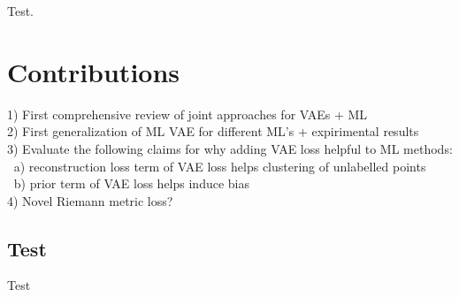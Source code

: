 \documentclass[./dissertation.tex]{subfiles}
\begin{document}
    
    Test.
    \section{Contributions}
        1) First comprehensive review of joint approaches for VAEs + ML \\
        2) First generalization of ML VAE for different ML's + expirimental results \\
        3) Evaluate the following claims for why adding VAE loss helpful to ML methods: \\
        $\>$ a) reconstruction loss term of VAE loss helps clustering of unlabelled points \\
        $\>$ b) prior term of VAE loss helps induce bias \\
        4) Novel Riemann metric loss? 

      \subsection{Test}
        Test
\end{document}
